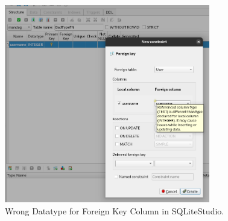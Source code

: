 \documentclass[a4paper,11pt,oneside]{article}
\begin{document}
\begin{sloppypar}
\begin{figure}[!htb]
  \centering
  \includegraphics[width=0.8\textwidth]{sqlitestudio/badfndatatype.png}
  \caption{Wrong Datatype for Foreign Key Column in SQLiteStudio.}
  \label{fig:badfndatatype}
\end{figure}






\end{sloppypar}
\end{document}
